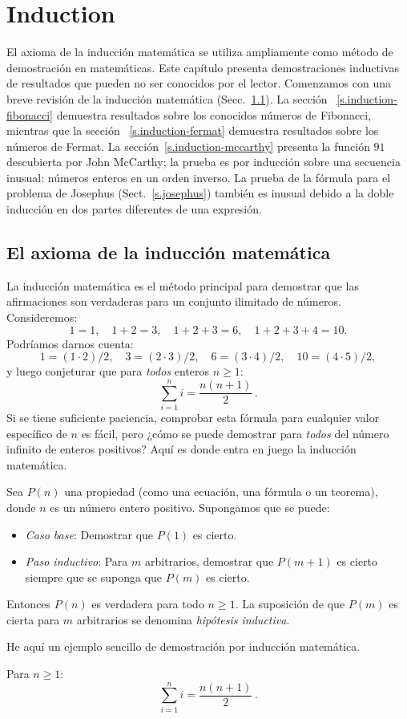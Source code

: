 
\chapter{Induction}\label{c.induction}


El axioma de la inducción matemática se utiliza ampliamente como método de demostración en matemáticas. Este capítulo presenta demostraciones inductivas de resultados que pueden no ser conocidos por el lector. Comenzamos con una breve revisión de la inducción matemática (Secc.~\ref{s.induction-axiom}). La sección ~\ref{s.induction-fibonacci} demuestra resultados sobre los conocidos números de Fibonacci, mientras que la sección ~\ref{s.induction-fermat} demuestra resultados sobre los números de Fermat. La sección~\ref{s.induction-mccarthy} presenta la función $91$ descubierta por John McCarthy; la prueba es por inducción sobre una secuencia inusual: números enteros en un orden inverso. La prueba de la fórmula para el problema de Josephus (Sect.~\ref{s.josephus}) también es inusual debido a la doble inducción en dos partes diferentes de una expresión.

\section{El axioma de la inducción matemática}\label{s.induction-axiom}

La inducción matemática es el método principal para demostrar que las afirmaciones son verdaderas para un conjunto ilimitado de números. Consideremos:
\[
1=1,\quad 1+2=3,\quad 1+2+3=6,\quad 1+2+3+4=10.
\]
Podríamos darnos cuenta:
\[
1=(1\cdot 2)/2,\quad 3=(2\cdot 3)/2,\quad  6=(3\cdot 4)/2,\quad 10=(4\cdot 5)/2,
\]
y luego conjeturar que para \emph{todos} enteros $n\geq 1$:
\[
\sum_{i=1}^n i = \frac{n(n+1)}{2}\,.
\]
Si se tiene suficiente paciencia, comprobar esta fórmula para cualquier valor específico de $n$ es fácil, pero ¿cómo se puede demostrar para \emph{todos} del número infinito de enteros positivos? Aquí es donde entra en juego la inducción matemática.

\begin{axiom}
Sea $P(n)$ una propiedad (como una ecuación, una fórmula o un teorema), donde $n$ es un número entero positivo. Supongamos que se puede:
\begin{itemize}
\item \emph{Caso base}: Demostrar que $P(1)$ es cierto.
\item \emph{Paso inductivo}: Para $m$ arbitrarios, demostrar que $P(m+1)$ es cierto siempre que se suponga que $P(m)$ es cierto.
\end{itemize}
Entonces $P(n)$ es verdadera para todo $n\geq 1$.
La suposición de que $P(m)$ es cierta para $m$ arbitrarios se denomina \emph{hipótesis inductiva}.
\end{axiom}
He aquí un ejemplo sencillo de demostración por inducción matemática.
\begin{theorem}\label{t.sum}
Para $n\geq 1$:
\[
\sum_{i=1}^n i = \frac{n(n+1)}{2}\,.
\]
\end{theorem}

